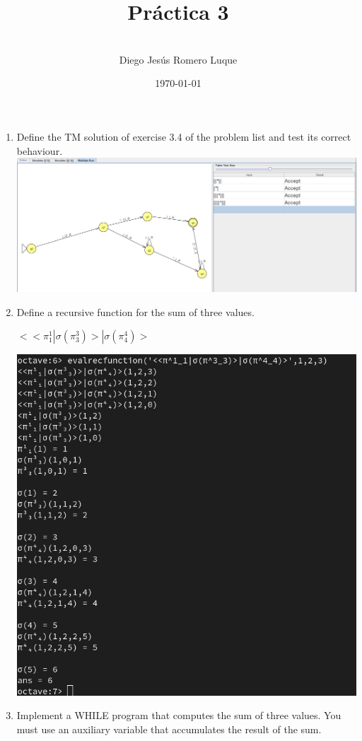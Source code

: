 \documentclass{article}
\title{\textbf{Pr\'actica 3}}
\author{\\Diego Jes\'us Romero Luque}
\date{\today}
\begin{document}
\maketitle
\pagebreak

\begin{enumerate}
  \item Define the TM solution of exercise 3.4 of the problem list and test its correct behaviour.\\
      \includegraphics[scale=0.35]{TM.png}
  \pagebreak
  \item Define a recursive function for the sum of three values.
    \begin{center}
      $<$$<\pi^1_1|\sigma(\pi^3_3)>|\sigma(\pi^4_4)>$
    \end{center}
    \includegraphics[scale=0.35]{SumaRec.png}
    \pagebreak
  \item Implement a WHILE program that computes the sum of three values. You
   must use an auxiliary variable that accumulates the result of the sum.\\
\end{enumerate}
\end{document}
